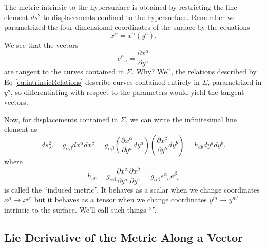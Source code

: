 The metric intrinsic to
the hypersurface is obtained by restricting the line element $ds^2$ to
displacements confined to the hypersurface. Remember we
parametrized the four dimensional coordinates of the surface by
the equations
\begin{equation}\label{eq:intrinsicRelations}
x^{\alpha}=x^{\alpha}(y^a).
\end{equation}
We see that the vectors
\begin{equation}%
{e^{\alpha}}_{a} = \frac{\partial x^{\alpha}}{\partial y^a}
\end{equation}
are tangent to the curves contained in $\Sigma$. Why? Well, the
relations described by Eq \eqref{eq:intrinsicRelations} describe
curves contained entirely in $\Sigma$, parametrized in $y^a$, so
differentiating with respect to the parameters would yield the
tangent vectors.

Now, for displacements contained in $\Sigma$, we can write the
infinitesimal line element as
\begin{equation}%
ds_{\Sigma}^{2} = g_{\alpha\beta}dx^{\alpha}dx^{\beta} =
g_{\alpha\beta}\left(\frac{\partial x^{\alpha}}{\partial y^{a}}dy^{a}\right)\left(\frac{\partial x^{\beta}}{\partial y^{b}}dy^{b}\right)
= h_{ab}dy^ady^b.
\end{equation}
where
\begin{equation}%
h_{ab} = g_{\alpha\beta}\frac{\partial x^{\alpha}}{\partial
  y^{a}}\frac{\partial x^{\beta}}{\partial y^{b}} = g_{\alpha\beta}{e^{\alpha}}_{a}{e^{\beta}}_{b}
\end{equation}
is called the ``induced metric''. It behaves as a scalar when we
change coordinates $x^{\mu}\to x^{\mu'}$ but it behaves as a
tensor when we change coordinates $y^{m}\to y^{m'}$ intrinsic to
the surface. We'll call such things ``''. 

\subsection{Lie Derivative of the Metric Along a Vector}\label{sstn:lieDerivativeOfMetricAlongVector}


